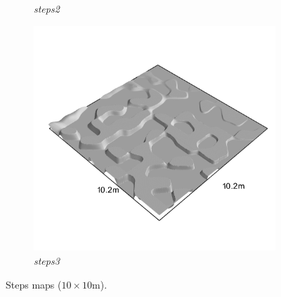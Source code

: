 \documentclass[../document.tex]{subfiles}
\begin{document}
\begin{figure}[htbp]
\begin{subfigure}[b]{0.32\linewidth}
            \caption{\emph{steps2}}
            \end{subfigure}    
          \begin{subfigure}[b]{0.32\textwidth}
            \includegraphics[width=\textwidth]{../img/hm3d_borders/steps3.png}
            \caption{\emph{steps3}}
        \end{subfigure}    
    \caption{Steps maps ($10\times10$m).}
\end{figure}
\end{document}
